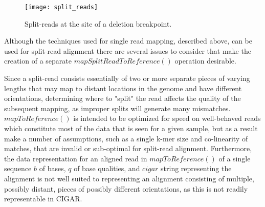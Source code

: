 \begin{figure}[H]
    \texttt{[image: split\_reads]}
    \centering
    \caption {Split-reads at the site of a deletion breakpoint.}
    \label{fig:split_reads}
\end{figure}

Although the techniques used for single read mapping, described above, can be used for split-read alignment there are several issues to consider that make the creation of a separate $mapSplitReadToReference()$ operation desirable. 

Since a split-read consists essentially of two or more separate pieces of varying lengths that may map to distant locations in the genome and have different orientations, determining where to "split" the read affects the quality of the subsequent mapping, as improper splits will generate many mismatches. $mapToReference()$ is intended to be optimized for speed on well-behaved reads which constitute most of the data that is seen for a given sample, but as a result make a number of assumptions, such as a single k-mer size and co-linearity of matches, that are invalid or sub-optimal for split-read alignment. Furthermore, the data representation for an aligned read in $mapToReference()$ of a single sequence $b$ of bases, $q$ of base qualities, and $cigar$ string representing the alignment is not well suited to representing an alignment consisting of multiple, possibly distant, pieces of possibly different orientations, as this is not readily representable in CIGAR. 

